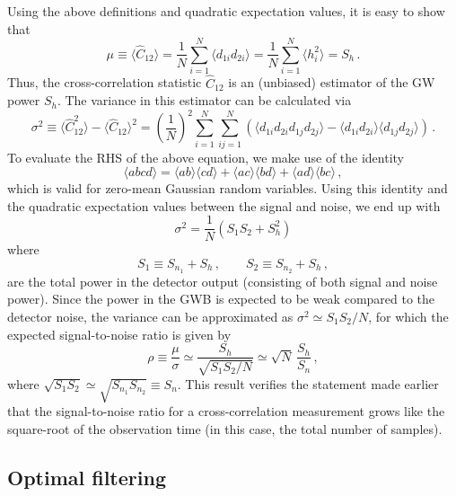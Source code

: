 \documentclass[11pt]{article}
\numberwithin{equation}{section}
\def\be{\begin{equation}}
\def\ee{\end{equation}}
\begin{document}
Using the above definitions and quadratic expectation 
values, it is easy to show that
%
\be
\mu\equiv \langle \hat C_{12}\rangle
= \frac{1}{N}\sum_{i=1}^N \langle d_{1i} d_{2i}\rangle
= \frac{1}{N}\sum_{i=1}^N \langle h_i^2\rangle
= S_h\,.
\ee
%
Thus, the cross-correlation statistic $\hat C_{12}$ is 
an (unbiased) estimator of the GW power $S_h$.
The variance in this estimator can be calculated via
%
\be
\sigma^2\equiv \langle \hat C_{12}^2\rangle-
\langle \hat C_{12}\rangle^2
=\left(\frac{1}{N}\right)^2
\sum_{i=1}^N \sum_{ij=1}^N 
\left(\langle d_{1i} d_{2i} d_{1j} d_{2j}\rangle - 
\langle d_{1i} d_{2i}\rangle \langle d_{1j} d_{2j}\rangle\right)\,.
\ee
%
To evaluate the RHS of the above equation, we make use of 
the identity
%
\be
\langle abcd\rangle =
\langle ab\rangle\langle cd\rangle + \langle ac\rangle \langle bd\rangle 
+\langle ad\rangle \langle bc\rangle\,,
\ee
%
which is valid for zero-mean Gaussian random variables.
Using this identity and the quadratic expectation values
between the signal and noise, we end up with
%
\be
\sigma^2 = \frac{1}{N}(S_1 S_2 + S_h^2)
\ee
%
where 
%
\be
S_1\equiv S_{n_1} + S_h\,,
\qquad
S_2\equiv S_{n_2} + S_h\,,
\ee
%
are the total power in the detector output (consisting of 
both signal and noise power).
Since the power in the GWB is expected to be weak compared
to the detector noise, the variance can be approximated
as $\sigma^2\simeq S_1 S_2/N$, for which the expected 
signal-to-noise ratio is given by
%
\be
\rho\equiv \frac{\mu}{\sigma}\simeq \frac{S_h}{\sqrt{S_1 S_2/N}}
\simeq \sqrt{N}\,\frac{S_h}{S_n}\,,
\ee
%
where $\sqrt{S_1 S_2}\simeq\sqrt{S_{n_1} S_{n_2}}\equiv S_n$.
This result verifies the statement made earlier that the signal-to-noise
ratio for a cross-correlation measurement grows like the square-root 
of the observation time (in this case, the total number of samples).

\subsection{Optimal filtering}
\label{s:optimal_filtering}
\end{document}
